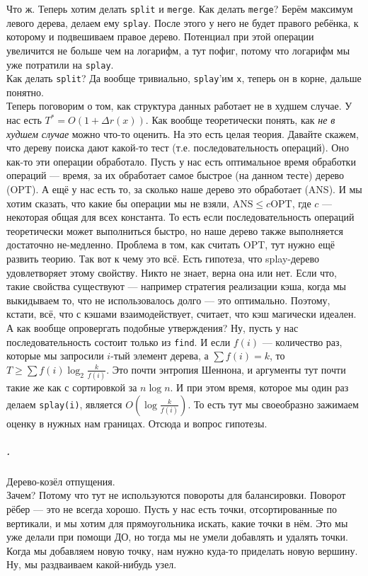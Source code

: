 \documentclass{article}
\newcommand{\pseudo}{PseudoLexer.py:PseudoLexer -x}
\newcommand{\pseudocode}[1]{\texttt{#1}}
\begin{document}
    Что ж. Теперь хотим делать \pseudocode{split} и \pseudocode{merge}. Как делать \pseudocode{merge}? Берём максимум левого дерева, делаем ему \pseudocode{splay}. После этого у него не будет правого ребёнка, к которому и подвешиваем правое дерево. Потенциал при этой операции увеличится не больше чем на логарифм, а тут пофиг, потому что логарифм мы уже потратили на \pseudocode{splay}.\\
    Как делать \pseudocode{split}? Да вообще тривиально, \pseudocode{splay}'им \pseudocode{x}, теперь он в корне, дальше понятно.\\
    Теперь поговорим о том, как структура данных работает не в худшем случае. У нас есть $T^*=O(1+\Delta r(x))$. Как вообще теоретически понять, как \textit{не в худшем случае} можно что-то оценить. На это есть целая теория. Давайте скажем, что дереву поиска дают какой-то тест (т.е. последовательность операций). Оно как-то эти операции обработало. Пусть у нас есть оптимальное время обработки операций --- время, за их обработает самое быстрое (на данном тесте) дерево (OPT). А ещё у нас есть то, за сколько наше дерево это обработает (ANS). И мы хотим сказать, что какие бы операции мы не взяли, $\mathrm{ANS}\leqslant c\mathrm{OPT}$, где $c$ --- некоторая общая для всех константа. То есть если последовательность операций теоретически может выполниться быстро, но наше дерево также выполняется достаточно не-медленно. Проблема в том, как считать OPT, тут нужно ещё развить теорию. Так вот к чему это всё. Есть гипотеза, что splay-дерево удовлетворяет этому свойству. Никто не знает, верна она или нет. Если что, такие свойства существуют --- например стратегия реализации кэша, когда мы выкидываем то, что не использовалось долго --- это оптимально. Поэтому, кстати, всё, что с кэшами взаимодействует, считает, что кэш магически идеален. А как вообще опровергать подобные утверждения? Ну, пусть у нас последовательность состоит только из \pseudocode{find}. И если $f(i)$ --- количество раз, которые мы запросили $i$-тый элемент дерева, а $\sum f(i)=k$, то $T\geqslant\sum f(i)\log_2\frac k{f(i)}$. Это почти энтропия Шеннона, и аргументы тут почти такие же как с сортировкой за $n\log n$. И при этом время, которое мы один раз делаем \pseudocode{splay(i)}, является $O(\log\frac k{f(i)})$. То есть тут мы своеобразно зажимаем оценку в нужных нам границах. Отсюда и вопрос гипотезы.
    \subparagraph{.}
    Дерево-козёл отпущения.\\
    Зачем? Потому что тут не используются повороты для балансировки. Поворот рёбер --- это не всегда хорошо. Пусть у нас есть точки, отсортированные по вертикали, и мы хотим для прямоугольника искать, какие точки в нём. Это мы уже делали при помощи ДО, но тогда мы не умели добавлять и удалять точки. Когда мы добавляем новую точку, нам нужно куда-то приделать новую вершину. Ну, мы раздваиваем какой-нибудь узел.
\end{document}

